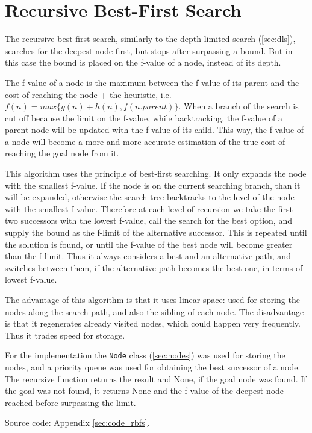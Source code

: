 \section{Recursive Best-First Search} 

The recursive best-first search, similarly to the depth-limited search (\ref{sec:dls}), searches for the deepest node first, but stops after surpassing a bound. But in this case the bound is placed on the f-value of a node, instead of its depth.

The f-value of a node is the maximum between the f-value of its parent and the cost of reaching the node + the heuristic, i.e. $f(n) = max\{ g(n) + h(n), f(n.parent) \}$. When a branch of the search is cut off because the limit on the f-value, while backtracking, the f-value of a parent node will be updated with the f-value of its child. This way, the f-value of a node will become a more and more accurate estimation of the true cost of reaching the goal node from it.

This algorithm uses the principle of best-first searching. It only expands the node with the smallest f-value. If the node is on the current searching branch, than it will be expanded, otherwise the search tree backtracks to the level of the node with the smallest f-value. Therefore at each level of recursion we take the first two successors with the lowest f-value, call the search for the best option, and supply the bound as the f-limit of the alternative successor. This is repeated until the solution is found, or until the f-value of the best node will become greater than the f-limit. Thus it always considers a best and an alternative path, and switches between them, if the alternative path becomes the best one, in terms of lowest f-value.

The advantage of this algorithm is that it uses linear space: used for storing the nodes along the search path, and also the sibling of each node. The disadvantage is that it regenerates already visited nodes, which could happen very frequently. Thus it trades speed for storage.

For the implementation the \verb|Node| class (\ref{sec:nodes}) was used for storing the nodes, and a priority queue was used for obtaining the best successor of a node. The recursive function returns the result and None, if the goal node was found. If the goal was not found, it returns None and the f-value of the deepest node reached before surpassing the limit.

Source code: Appendix \ref{sec:code_rbfs}.

